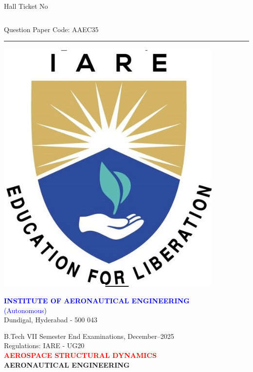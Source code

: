 \documentclass[11pt,paper=a4,answers]{exam}
\begin{document}
	\setlength{\tabcolsep}{10pt}
\renewcommand{\arraystretch}{1.5}
Hall Ticket No 
\begin{tabular}{|c| c| c| c| c| c|c| c| c| c|} \hline
	& & &&&&&&&\\ [0.5ex]\hline
\end{tabular}
\hfill Question Paper Code: AAEC35
\vspace{5pt}\hrule
\vspace{5pt}

\begin{minipage}{0.15\linewidth}%
	\flushleft
	\includegraphics[width=0.85\textwidth]{iare.png}\end{minipage}
\begin{minipage}[r]{0.85\textwidth}%
	\noindent
	\begin{center}	
	\textcolor{blue}{\Large \bfseries INSTITUTE OF AERONAUTICAL ENGINEERING}\\
	\textcolor{blue}{\Large (Autonomous)} \\
	\small Dundigal, Hyderabad - 500 043 \\  [3pt] 
	 \par \vspace{3pt}
	B.Tech VII Semester End Examinations, December–2025 \\ \vspace{3pt}
	Regulations: IARE - UG20 \\\vspace{3pt}
	\textcolor{red}{\large \bfseries AEROSPACE STRUCTURAL DYNAMICS } \\\vspace{3pt}
	\large \bfseries AERONAUTICAL ENGINEERING
\end{center}
\end{minipage}
\end{document}
